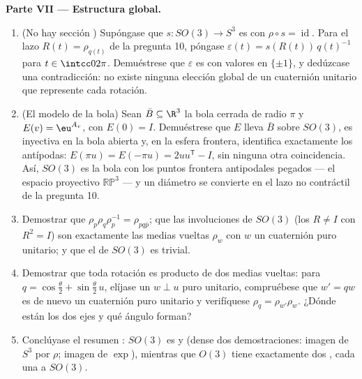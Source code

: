 \begin{problem}
\medskip
\noindent\textbf{Parte VII --- Estructura global.}
\begin{enumerate}[resume]
  \item (No hay sección )
  Supóngase que $s \colon SO(3) \to
        S^3$ es  con
  $\rho \circ s =
        \operatorname{id}$. Para el lazo $R(t) =
        \rho_{q(t)}$ de la pregunta 10, póngase $\varepsilon(t) =
        s(R(t))\,q(t)^{-1}$ para $t \in \intcc0{2\pi}$. Demuéstrese que
  $\varepsilon$ es  con
  valores en $\{\pm1\}$, y dedúzcase una contradicción: no existe
  ninguna elección global 
  de un cuaternión unitario que represente cada rotación. \item (El
  modelo de la bola) Sean $\bar B \subseteq \R^3$ la bola cerrada de
  radio $\pi$ y $E(v) = \eu^{A_v}$, con $E(0) = I$. Demuéstrese que $E$
  lleva $\bar B$ sobre $SO(3)$, es inyectiva en la bola abierta y, en la
  esfera frontera, identifica exactamente los antípodas:
  $E(\pi u) = E(-\pi u) = 2uu^{\mathsf T} - I$, sin ninguna otra
  coincidencia. Así, $SO(3)$ es la bola con los puntos frontera
  antipodales pegados --- el espacio proyectivo $\mathbb{RP}^3$ --- y un
  diámetro se convierte en el lazo no contráctil de la pregunta 10.
  \item Demostrar que $\rho_p\rho_q\rho_p^{-1} = \rho_{pq\bar
        p}$; que las involuciones de $SO(3)$ (los $R \neq
        I$ con $R^2 = I$) son exactamente las medias vueltas $\rho_w$
  con $w$ un cuaternión puro unitario; y que el
   de $SO(3)$ es trivial. \item
  Demostrar que toda rotación es producto de dos medias vueltas: para
  $q = \cos\frac\theta2 +
        \sin\frac\theta2\,u$, elíjase un $w \perp
        u$ puro unitario, compruébese que $w' = qw$ es de nuevo un
  cuaternión puro unitario y verifíquese $\rho_q =
        \rho_{w'}\rho_w$. ¿Dónde están los dos ejes y qué ángulo forman?
  \item Conclúyase el resumen
  : $SO(3)$ es
   y
   (dense dos
  demostraciones: imagen 
  de $S^3$ por $\rho$; imagen de $\exp$), mientras que $O(3)$ tiene
  exactamente dos , cada una  a
  $SO(3)$.


\end{enumerate}
\end{problem}
